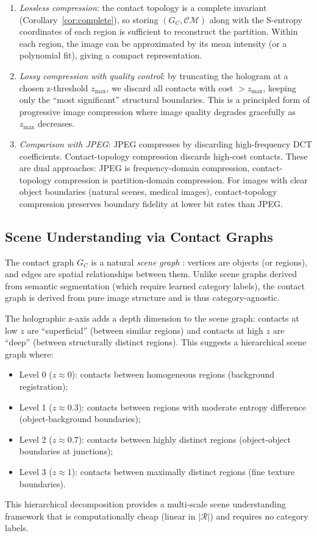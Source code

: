 \documentclass[twocolumn]{article}
\theoremstyle{plain}
\theoremstyle{definition}
\newcommand{\CM}{\mathcal{CM}}
\newcommand{\GC}{G_C}
\begin{document}
\begin{enumerate}[label=(\roman*)]
\item \emph{Lossless compression}: the contact topology is a complete invariant
  (Corollary~\ref{cor:complete}), so storing $(\GC, \CM)$ along with the
  S-entropy coordinates of each region is sufficient to reconstruct the partition.
  Within each region, the image can be approximated by its mean intensity (or a
  polynomial fit), giving a compact representation.

\item \emph{Lossy compression with quality control}: by truncating the hologram
  at a chosen z-threshold $z_{\max}$, we discard all contacts with cost $> z_{\max}$,
  keeping only the ``most significant'' structural boundaries. This is a
  principled form of progressive image compression where image quality degrades
  gracefully as $z_{\max}$ decreases.

\item \emph{Comparison with JPEG}: JPEG compresses by discarding high-frequency
  DCT coefficients. Contact-topology compression discards high-cost contacts.
  These are dual approaches: JPEG is frequency-domain compression, contact-topology
  compression is partition-domain compression. For images with clear object
  boundaries (natural scenes, medical images), contact-topology compression
  preserves boundary fidelity at lower bit rates than JPEG.
\end{enumerate}

\subsection{Scene Understanding via Contact Graphs}

The contact graph $\GC$ is a natural \emph{scene graph} \cite{zahn1971graph}:
vertices are objects (or regions), and edges are spatial relationships between
them. Unlike scene graphs derived from semantic segmentation (which require
learned category labels), the contact graph is derived from pure image structure
and is thus category-agnostic.

The holographic z-axis adds a depth dimension to the scene graph: contacts at
low $z$ are ``superficial'' (between similar regions) and contacts at high $z$
are ``deep'' (between structurally distinct regions). This suggests a hierarchical
scene graph where:
\begin{itemize}
\item Level 0 ($z \approx 0$): contacts between homogeneous regions (background
  registration);
\item Level 1 ($z \approx 0.3$): contacts between regions with moderate entropy
  difference (object-background boundaries);
\item Level 2 ($z \approx 0.7$): contacts between highly distinct regions
  (object-object boundaries at junctions);
\item Level 3 ($z \approx 1$): contacts between maximally distinct regions
  (fine texture boundaries).
\end{itemize}
This hierarchical decomposition provides a multi-scale scene understanding
framework that is computationally cheap (linear in $|\mathcal{R}|$) and requires
no category labels.
\end{document}
